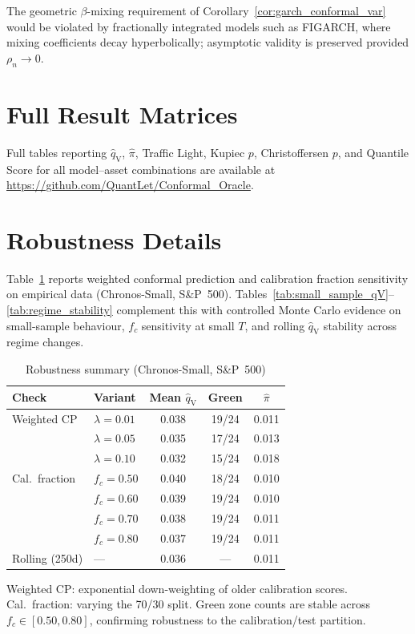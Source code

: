 \documentclass[preprint,11pt,authoryear]{elsarticle}
\newcommand{\1}{\boldsymbol{1}}
\newcommand{\qV}{\hat{q}_{\scriptscriptstyle\mathrm{V}}}
\begin{document}
	The geometric $\beta$-mixing requirement of Corollary~\ref{cor:garch_conformal_var} would be violated by fractionally integrated models such as FIGARCH, where mixing coefficients decay hyperbolically; asymptotic validity is preserved provided $\rho_n \to 0$.
	
	
	\section{Full Result Matrices}
	\label{app:full_results}
	
	Full tables reporting $\qV$, $\hat\pi$, Traffic Light, Kupiec $p$, Christoffersen $p$, and Quantile Score for all model--asset combinations are available at \url{https://github.com/QuantLet/Conformal_Oracle}.
	
	
	\section{Robustness Details}
	\label{app:robustness}
	
	Table~\ref{tab:robustness} reports weighted conformal prediction
	and calibration fraction sensitivity on empirical data
	(Chronos-Small, S\&P~500). Tables~\ref{tab:small_sample_qV}--\ref{tab:regime_stability}
	complement this with controlled Monte Carlo evidence on
	small-sample behaviour, $f_c$ sensitivity at small $T$, and
	rolling $\qV$ stability across regime changes.
	
	\begin{table}[H]
		\centering
		\caption{Robustness summary (Chronos-Small, S\&P~500)}
		\label{tab:robustness}
		\footnotesize
		\begin{tabular}{@{}llccc@{}}
			\toprule
			Check & Variant & Mean $\qV$ & Green & $\hat\pi$ \\
			\midrule
			Weighted CP     & $\lambda=0.01$  & 0.038 & 19/24 & 0.011 \\
			& $\lambda=0.05$  & 0.035 & 17/24 & 0.013 \\
			& $\lambda=0.10$  & 0.032 & 15/24 & 0.018 \\
			\midrule
			Cal.\ fraction  & $f_c=0.50$      & 0.040 & 18/24 & 0.010 \\
			& $f_c=0.60$      & 0.039 & 19/24 & 0.010 \\
			& $f_c=0.70$      & 0.038 & 19/24 & 0.011 \\
			& $f_c=0.80$      & 0.037 & 19/24 & 0.011 \\
			\midrule
			Rolling (250d)  & ---             & 0.036 & --- & 0.011 \\
			\bottomrule
		\end{tabular}
		\begin{minipage}{\linewidth}\footnotesize
			\smallskip
			Weighted CP: exponential down-weighting of older calibration scores. Cal.\ fraction: varying the 70/30 split. Green zone counts are stable across $f_c \in [0.50, 0.80]$, confirming robustness to the calibration/test partition.
		\end{minipage}
	\end{table}
	
	
	
	
	
	
	
\end{document}

